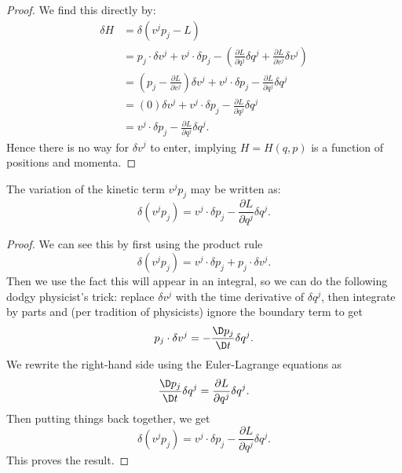 \begin{proof}
  We find this directly by:
  \begin{subequations}
    \begin{align}
\delta H
&= \delta(v^{j}p_{j} - L)\\
&= p_{j}\cdot\delta v^{j} + v^{j}\cdot\delta p_{j} -
\left(\frac{\partial L}{\partial q^{j}}\delta q^{j} + \frac{\partial L}{\partial v^{j}}\delta v^{j}\right)\\
&= \left(p_{j} - \frac{\partial L}{\partial v^{j}}\right)\delta v^{j}
+ v^{j}\cdot\delta p_{j} - \frac{\partial L}{\partial q^{j}}\delta q^{j}\\
&= (0)\delta v^{j} + v^{j}\cdot\delta p_{j} - \frac{\partial L}{\partial q^{j}}\delta q^{j}\\
&= v^{j}\cdot\delta p_{j} - \frac{\partial L}{\partial q^{j}}\delta q^{j}.
    \end{align}
  \end{subequations}
Hence there is no way for $\delta v^{j}$ to enter, implying $H=H(q,p)$
is a function of positions and momenta.
\end{proof}


\begin{lemma}\label{lemma:variation-of-kinetic-contribution}
  The variation of the kinetic term $v^{j}p_{j}$ may be written as:
  \begin{equation}
\delta(v^{j}p_{j}) = v^{j}\cdot\delta p_{j} -\frac{\partial L}{\partial q^{j}}\delta q^{j}.
  \end{equation}
\end{lemma}

\begin{proof}
  We can see this by first using the product rule
    \begin{equation}
\delta(v^{j}p_{j}) = v^{j}\cdot\delta p_{j} + p_{j}\cdot\delta v^{j}.
  \end{equation}
Then we use the fact this will appear in an integral, so we can do the
following dodgy physicist's trick: replace $\delta v^{j}$ with the time
derivative of $\delta q^{j}$, then
integrate by parts and (per tradition of physicists) ignore the boundary
term to get
\begin{equation}
p_{j}\cdot\delta v^{j} = -\frac{\D p_{j}}{\D t}\delta q^{j}.
\end{equation}
We rewrite the right-hand side using the Euler-Lagrange equations as
\begin{equation}
\frac{\D p_{j}}{\D t}\delta q^{j} = \frac{\partial L}{\partial q^{j}}\delta q^{j}.
\end{equation}
Then putting things back together, we get
\begin{equation}
\delta(v^{j}p_{j}) = v^{j}\cdot\delta p_{j} - \frac{\partial L}{\partial q^{j}}\delta q^{j}.
\end{equation}
This proves the result.
\end{proof}


